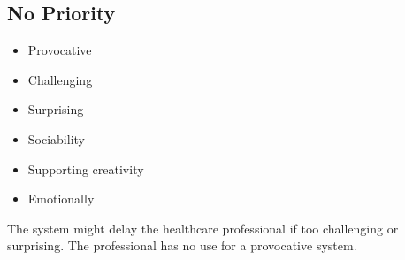 \subsection{No Priority}
\begin{itemize}
\item Provocative
\item Challenging
\item Surprising
\item Sociability
\item Supporting creativity
\item Emotionally
\end{itemize}
The system might delay the healthcare professional if too challenging or surprising. The professional has no use for a provocative system. 












